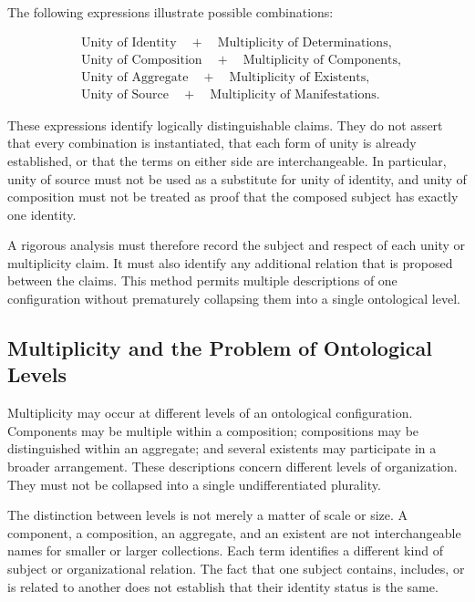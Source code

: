 The following expressions illustrate possible combinations:

\[
\begin{aligned}
&\text{Unity of Identity}
\quad+\quad
\text{Multiplicity of Determinations},
\\[4pt]
&\text{Unity of Composition}
\quad+\quad
\text{Multiplicity of Components},
\\[4pt]
&\text{Unity of Aggregate}
\quad+\quad
\text{Multiplicity of Existents},
\\[4pt]
&\text{Unity of Source}
\quad+\quad
\text{Multiplicity of Manifestations}.
\end{aligned}
\]

These expressions identify logically distinguishable claims.
They do not assert that every combination is instantiated,
that each form of unity is already established, or that
the terms on either side are interchangeable. In particular,
unity of source must not be used as a substitute for unity
of identity, and unity of composition must not be treated
as proof that the composed subject has exactly one identity.

A rigorous analysis must therefore record the subject and
respect of each unity or multiplicity claim. It must also
identify any additional relation that is proposed between
the claims. This method permits multiple descriptions of
one configuration without prematurely collapsing them
into a single ontological level.

\subsection{Multiplicity and the Problem of Ontological Levels}

Multiplicity may occur at different levels of an ontological
configuration. Components may be multiple within a composition;
compositions may be distinguished within an aggregate; and
several existents may participate in a broader arrangement.
These descriptions concern different levels of organization.
They must not be collapsed into a single undifferentiated
plurality.

The distinction between levels is not merely a matter of
scale or size. A component, a composition, an aggregate,
and an existent are not interchangeable names for smaller
or larger collections. Each term identifies a different
kind of subject or organizational relation. The fact that
one subject contains, includes, or is related to another
does not establish that their identity status is the same.

